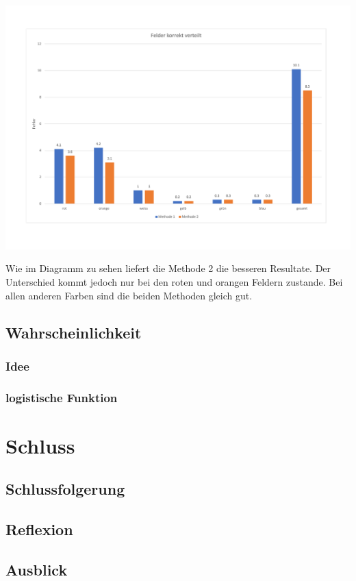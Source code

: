 \documentclass[a4paper, 12pt]{article}
\begin{document}
\includegraphics[scale=0.4]{Felder_korrekt_verteilt}

Wie im Diagramm zu sehen liefert die Methode 2 die besseren Resultate. Der Unterschied kommt jedoch nur bei den roten und orangen Feldern zustande. Bei allen anderen Farben sind die beiden Methoden gleich gut. 
\subsection{Wahrscheinlichkeit}
\subsubsection{Idee}
\subsubsection{logistische Funktion}
\section{Schluss}
\subsection{Schlussfolgerung}
\subsection{Reflexion}
\subsection{Ausblick}
\end{document}
